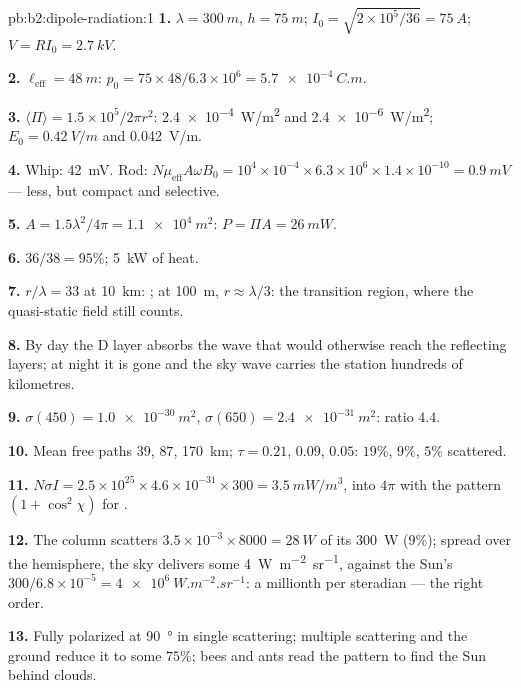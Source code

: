 \begin{solution}{pb:b2:dipole-radiation:1}
\textbf{1.} $\lambda = \qty{300}{m}$, $h = \qty{75}{m}$; $I_0 = \sqrt{2 \times 10^5/36} = \qty{75}{A}$;
$V = RI_0 = \qty{2.7}{kV}$.

\textbf{2.} $\ell_{\text{eff}} = \qty{48}{m}$: $p_0 = 75 \times 48/6.3 \times 10^6 = \qty{5.7e-4}{C.m}$.

\textbf{3.} $\langle\Pi\rangle = 1.5 \times 10^5/2\pi r^2$: \qty{2.4e-4}{W/m^2} and \qty{2.4e-6}{W/m^2};
$E_0 = \qty{0.42}{V/m}$ and \qty{0.042}{V/m}.

\textbf{4.} Whip: \qty{42}{mV}. Rod: $N\mu_{\text{eff}}A\omega B_0 = 10^4 \times 10^{-4} \times 6.3 \times
10^6 \times 1.4 \times 10^{-10} = \qty{0.9}{mV}$ --- less, but compact and selective.

\textbf{5.} $A = 1.5\lambda^2/4\pi = \qty{1.1e4}{m^2}$: $P = \Pi A = \qty{26}{mW}$.

\textbf{6.} $36/38 = 95\%$; \qty{5}{kW} of heat.

\textbf{7.} $r/\lambda = 33$ at \qty{10}{km}: ; at \qty{100}{m},
$r \approx \lambda/3$: the transition region, where the quasi-static field still
counts.

\textbf{8.} By day the D layer absorbs the wave that would otherwise
reach the reflecting layers; at night it is gone and the sky wave
carries the station hundreds of kilometres.

\textbf{9.} $\sigma(450) = \qty{1.0e-30}{m^2}$, $\sigma(650) = \qty{2.4e-31}{m^2}$: ratio $4.4$.

\textbf{10.} Mean free paths $39$, $87$, \qty{170}{km}; $\tau = 0.21$, $0.09$, $0.05$:
$19\%$, $9\%$, $5\%$ scattered.

\textbf{11.} $N\sigma I = 2.5 \times 10^{25} \times 4.6 \times 10^{-31} \times 300 = \qty{3.5}{mW/m^3}$,
into $4\pi$ with the pattern $(1 + \cos^2\chi)$ for .

\textbf{12.} The column scatters $3.5 \times 10^{-3} \times 8000 = \qty{28}{W}$ of its
\qty{300}{W} ($9\%$); spread over the hemisphere, the sky delivers some
\qty{4}{W.m^{-2}.sr^{-1}}, against the Sun's $300/6.8 \times 10^{-5} = \qty{4e6}{W.m^{-2}.sr^{-1}}$:
a millionth per steradian --- the right order.

\textbf{13.} Fully polarized at \qty{90}{\degree} in single scattering; multiple
scattering and the ground reduce it to some $75\%$; bees and ants read
the pattern to find the Sun behind clouds.


\end{solution}
